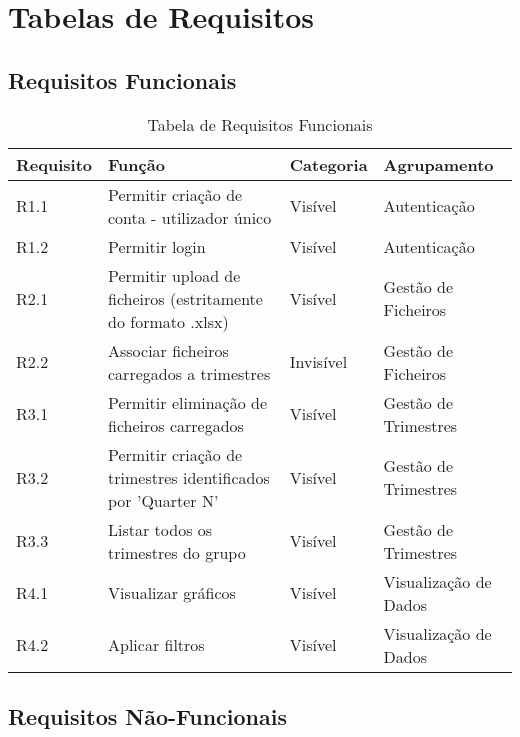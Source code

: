 \chapter{Tabelas de Requisitos}
\label{ch:tabRequisitos}

\section{Requisitos Funcionais}

\begin{table}[h!]
\centering
\begin{tabular}{|l|p{7cm}|l|l|}
\hline
\textbf{Requisito} & \textbf{Função} & \textbf{Categoria} & \textbf{Agrupamento} \\
\hline
R1.1 & Permitir criação de conta - utilizador único & Visível & Autenticação \\
R1.2 & Permitir login & Visível & Autenticação \\
R2.1 & Permitir upload de ficheiros (estritamente do formato .xlsx) & Visível & Gestão de Ficheiros \\
R2.2 & Associar ficheiros carregados a trimestres & Invisível & Gestão de Ficheiros \\
R3.1 & Permitir eliminação de ficheiros carregados & Visível & Gestão de Trimestres \\
R3.2 & Permitir criação de trimestres identificados por 'Quarter N' & Visível & Gestão de Trimestres \\
R3.3 & Listar todos os trimestres do grupo & Visível & Gestão de Trimestres \\
R4.1 & Visualizar gráficos & Visível & Visualização de Dados \\
R4.2 & Aplicar filtros & Visível & Visualização de Dados \\
\hline
\end{tabular}
\caption{Tabela de Requisitos Funcionais}
\label{tab:requisitosFuncionais}
\end{table}

\section{Requisitos Não-Funcionais}

